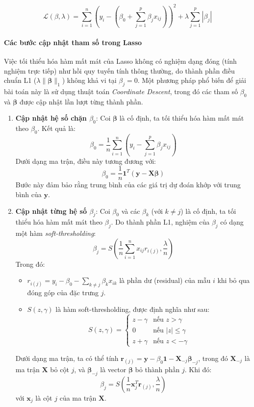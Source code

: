 \[
\mathcal{L}(\beta, \lambda) = \sum_{i=1}^n \left(y_i - \left(\beta_0 + \sum_{j=1}^p \beta_j x_{ij}\right)\right)^2 + \lambda \sum_{j=1}^p |\beta_j|
\]

\paragraph{Các bước cập nhật tham số trong Lasso}
Việc tối thiểu hóa hàm mất mát của Lasso không có nghiệm dạng đóng (tính nghiệm trực tiếp) như hồi quy tuyến tính thông thường, do thành phần điều chuẩn L1 (\( \lambda \|\boldsymbol{\beta}\|_1 \)) không khả vi tại \( \beta_j = 0 \). Một phương pháp phổ biến để giải bài toán này là sử dụng thuật toán \textit{Coordinate Descent}, trong đó các tham số \( \beta_0 \) và \( \boldsymbol{\beta} \) được cập nhật lần lượt từng thành phần.
\begin{enumerate}
    \item \textbf{Cập nhật hệ số chặn \( \beta_0 \)}: Coi \( \boldsymbol{\beta} \) là cố định, ta tối thiểu hóa hàm mất mát theo \( \beta_0 \). Kết quả là:
    \[
    \beta_0 = \frac{1}{n} \sum_{i=1}^n \left(y_i - \sum_{j=1}^p \beta_j x_{ij}\right)
    \]
    Dưới dạng ma trận, điều này tương đương với:
    \[
    \beta_0 = \frac{1}{n} \mathbf{1}^T (\mathbf{y} - \mathbf{X} \boldsymbol{\beta})
    \]
    Bước này đảm bảo rằng trung bình của các giá trị dự đoán khớp với trung bình của \( \mathbf{y} \).
    
    \item \textbf{Cập nhật từng hệ số \( \beta_j \)}: Coi \( \beta_0 \) và các \( \beta_k \) (với \( k \neq j \)) là cố định, ta tối thiểu hóa hàm mất mát theo \( \beta_j \). Do thành phần L1, nghiệm của \( \beta_j \) có dạng một hàm \textit{soft-thresholding}:
    \[
    \beta_j = S\left( \frac{1}{n} \sum_{i=1}^n x_{ij} r_{i(j)}, \frac{\lambda}{n} \right)
    \]
    Trong đó:
    \begin{itemize}
        \item \( r_{i(j)} = y_i - \beta_0 - \sum_{k \neq j} \beta_k x_{ik} \) là phần dư (residual) của mẫu \( i \) khi bỏ qua đóng góp của đặc trưng \( j \).
        \item \( S(z, \gamma) \) là hàm soft-thresholding, được định nghĩa như sau:
        \[
        S(z, \gamma) = 
        \begin{cases} 
        z - \gamma & \text{nếu } z > \gamma \\
        0 & \text{nếu } |z| \leq \gamma \\
        z + \gamma & \text{nếu } z < -\gamma 
        \end{cases}
        \]
    \end{itemize}
    Dưới dạng ma trận, ta có thể tính \( \mathbf{r}_{(j)} = \mathbf{y} - \beta_0 \mathbf{1} - \mathbf{X}_{-j} \boldsymbol{\beta}_{-j} \), trong đó \( \mathbf{X}_{-j} \) là ma trận \( \mathbf{X} \) bỏ cột \( j \), và \( \boldsymbol{\beta}_{-j} \) là vector \( \boldsymbol{\beta} \) bỏ thành phần \( j \). Khi đó:
    \[
    \beta_j = S\left( \frac{1}{n} \mathbf{x}_j^T \mathbf{r}_{(j)}, \frac{\lambda}{n} \right)
    \]
    với \( \mathbf{x}_j \) là cột \( j \) của ma trận \( \mathbf{X} \).
\end{enumerate}

